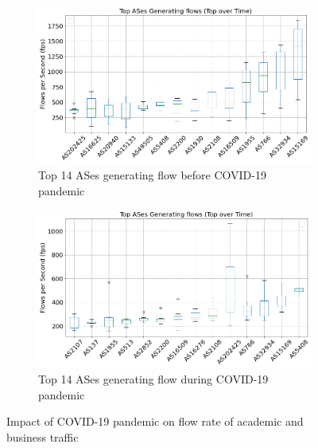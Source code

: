 \documentclass[10pt, journal, letterpaper]{IEEEtran}
\newcommand\linearFigSze{0.48}
\begin{document}
\begin{figure}
    \begin{subfigure}{\linearFigSze\textwidth}
          \centering
          \includegraphics[width=\columnwidth]{img/BCO2_top14AS_generating_fps.png}
          \caption{Top 14 ASes generating flow before COVID-19 pandemic}
          \label{fig:BCO2_topAS_gen_fps}
    \end{subfigure}
    \begin{subfigure}{\linearFigSze\textwidth}
          \centering
          \includegraphics[width=\columnwidth]{img/CO2_top14AS_generating_fps.png}
          \caption{Top 14 ASes generating flow during COVID-19 pandemic}
          \label{fig:Co2_topAS_gen_fps}
    \end{subfigure}
    \caption{Impact of COVID-19 pandemic on flow rate of academic and business traffic}
    \label{fig:flowrate_topAS_gen_BCO_CO}
\end{figure}
\end{document}
